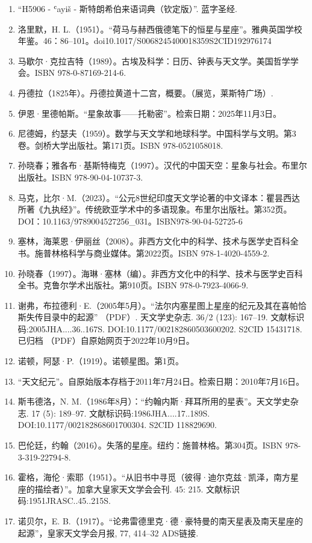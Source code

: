 \begin{enumerate}
\item “H5906 - ʿayiš - 斯特朗希伯来语词典（钦定版）”. 蓝字圣经.
\item 洛里默，H. L.（1951）。“荷马与赫西俄德笔下的恒星与星座”。雅典英国学校年鉴。46：86–101。doi10.1017/S0068245400018359S2CID192976174
\item 马歇尔·克拉吉特（1989）。古埃及科学：日历、钟表与天文学。美国哲学学会。ISBN 978-0-87169-214-6.
\item 丹德拉（1825年）。丹德拉黄道十二宫，概要。（展览，莱斯特广场）.
\item 伊恩·里德帕斯。“星象故事——托勒密”。检索日期：2025年11月3日。
\item 尼德姆，约瑟夫（1959）。数学与天文学和地球科学。中国科学与文明。第3卷。剑桥大学出版社。第171页。ISBN 978-0521058018.
\item 孙晓春；雅各布·基斯特梅克（1997）。汉代的中国天空：星象与社会。布里尔出版社。ISBN 978-90-04-10737-3.
\item 马克，比尔·M.（2023）。“公元8世纪印度天文学论著的中文译本：瞿昙西达所著《九执经》”。传统欧亚学术中的多语现象。布里尔出版社。第352页。DOI：10.1163/9789004527256_031。ISBN978-90-04-52725-6
\item 塞林，海莱恩·伊丽丝（2008）。非西方文化中的科学、技术与医学史百科全书。施普林格科学与商业媒体。第2022页。ISBN 978-1-4020-4559-2.
\item 孙晓春（1997）。海琳·塞林（编）。非西方文化中的科学、技术与医学史百科全书。克鲁尔学术出版社。第910页。ISBN 978-0-7923-4066-9.
\item 谢弗，布拉德利·E.（2005年5月）。“法尔内塞星图上星座的纪元及其在喜帕恰斯失传目录中的起源” （PDF）. 天文学史杂志. 36/2 (123): 167–19. 文献标识码:2005JHA....36..167S. DOI:10.1177/002182860503600202. S2CID 15431718. 已归档 （PDF）自原始网页于2022年10月9日。
\item 诺顿，阿瑟·P.（1919）。诺顿星图。第1页。
\item “天文纪元”。自原始版本存档于2011年7月24日。检索日期：2010年7月16日。
\item 斯韦德洛，N. M.（1986年8月）：“约翰内斯·拜耳所用的星表”。天文学史杂志. 17 (5): 189–97. 文献标识码:1986JHA....17..189S. DOI:10.1177/002182868601700304. S2CID 118829690.
\item 巴伦廷，约翰（2016）。失落的星座。纽约：施普林格。第304页。ISBN 978-3-319-22794-8.
\item 霍格，海伦·索耶（1951）。“从旧书中寻觅（彼得·迪尔克兹·凯泽，南方星座的描绘者）”。加拿大皇家天文学会会刊. 45: 215. 文献标识码:1951JRASC..45..215S.
\item 诺贝尔，E. B.（1917）。“论弗雷德里克·德·豪特曼的南天星表及南天星座的起源”，皇家天文学会月报, 77, 414–32 ADS链接.

\end{enumerate}
